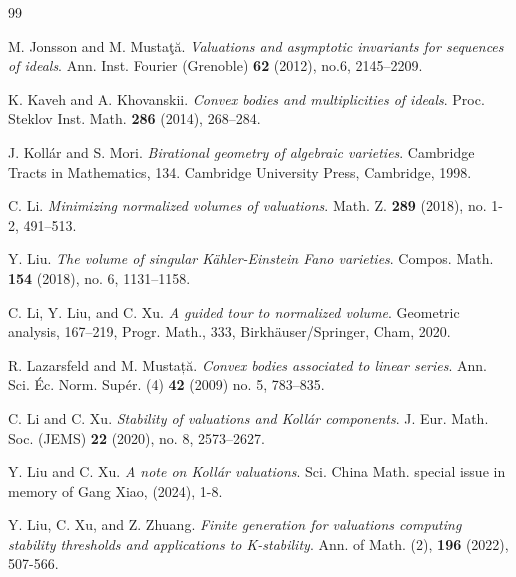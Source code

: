 \documentclass[11pt, leqno]{amsart}%
\theoremstyle{plain}
\theoremstyle{definition}
\theoremstyle{remark}
\numberwithin{equation}{section}
\begin{document}
\begin{thebibliography}{99}
	
     M. Jonsson and M. Musta\c{t}\u{a}. \emph{Valuations and asymptotic invariants for sequences of ideals}.
    Ann. Inst. Fourier (Grenoble)  \textbf{62} (2012), no.6, 2145--2209.
	
     K. Kaveh and A. Khovanskii. \emph{Convex bodies and multiplicities of ideals}.
    Proc. Steklov Inst. Math. \textbf{286} (2014), 268–284.
	
     J. Koll\'ar and S. Mori. \emph{Birational geometry of algebraic varieties}. 
    Cambridge Tracts in Mathematics, 134. Cambridge University Press, Cambridge, 1998.
	
	
	
     C. Li. \emph{Minimizing normalized volumes of valuations}. 
    Math. Z. \textbf{289} (2018), no. 1-2, 491--513.
	
     Y. Liu. \emph{The volume of singular K\"ahler-Einstein Fano varieties}. 
    Compos. Math. \textbf{154} (2018), no. 6, 1131--1158.
	
     C. Li,  Y. Liu, and C. Xu. \emph{A guided tour to normalized volume}. 
    Geometric analysis, 167--219, Progr. Math., 333, Birkh\"{a}user/Springer, Cham, 2020.
	
     R. Lazarsfeld and M. Mustață. \emph{Convex bodies associated to linear series}. 
    Ann. Sci. \'{E}c. Norm. Sup\'{e}r. (4) \textbf{42} (2009) no. 5, 783--835.
	
	
     C. Li and C. Xu. \emph{Stability of valuations and Koll\'ar components}. 
    J. Eur. Math. Soc. (JEMS) \textbf{22} (2020), no. 8, 2573--2627.

     Y. Liu and C. Xu. \emph{A note on Koll\'ar valuations}.
     Sci. China Math. special issue in memory of Gang Xiao, (2024), 1-8.

     Y. Liu, C. Xu, and Z. Zhuang. \emph{Finite generation for valuations computing stability thresholds and applications to K-stability}. 
    Ann. of Math. (2), \textbf{196} (2022), 507-566.
	

\end{thebibliography}
\end{document}
